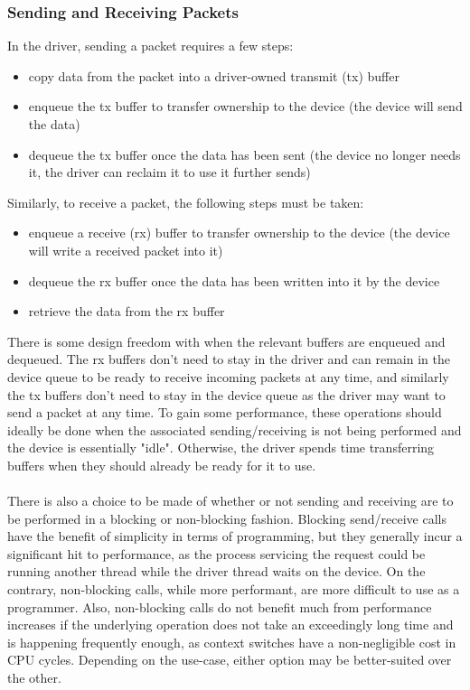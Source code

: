 \subsubsection{Sending and Receiving Packets}
In the driver, sending a packet requires a few steps:
\begin{itemize}
    \item copy data from the packet into a driver-owned transmit (tx) buffer
    \item enqueue the tx buffer to transfer ownership to the device (the device will send the data)
    \item dequeue the tx buffer once the data has been sent (the device no longer needs it, the driver can reclaim it to use it further sends)
\end{itemize}
Similarly, to receive a packet, the following steps must be taken:
\begin{itemize}
    \item enqueue a receive (rx) buffer to transfer ownership to the device (the device will write a received packet into it)
    \item dequeue the rx buffer once the data has been written into it by the device
    \item retrieve the data from the rx buffer
\end{itemize}
There is some design freedom with when the relevant buffers are enqueued and dequeued. The rx buffers don't need to stay in the driver and can remain in the device queue to be ready to receive incoming packets at any time, and similarly the tx buffers don't need to stay in the device queue as the driver may want to send a packet at any time. To gain some performance, these operations should ideally be done when the associated sending/receiving is not being performed and the device is essentially "idle". Otherwise, the driver spends time transferring buffers when they should already be ready for it to use.
\\\\
There is also a choice to be made of whether or not sending and receiving are to be performed in a blocking or non-blocking fashion. Blocking send/receive calls have the benefit of simplicity in terms of programming, but they generally incur a significant hit to performance, as the process servicing the request could be running another thread while the driver thread waits on the device. On the contrary, non-blocking calls, while more performant, are more difficult to use as a programmer. Also, non-blocking calls do not benefit much from performance increases if the underlying operation does not take an exceedingly long time and is happening frequently enough, as context switches have a non-negligible cost in CPU cycles. Depending on the use-case, either option may be better-suited over the other.

